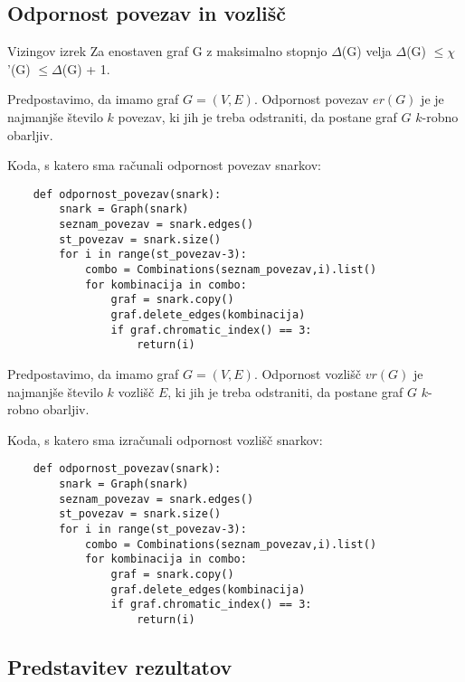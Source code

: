 \documentclass[a4paper, 10pt]{article}
\begin{document}
\subsection*{Odpornost povezav in vozlišč}

\begin{theorem}{Vizingov izrek}
    Za enostaven graf G z maksimalno stopnjo $\Delta$(G) velja
    $\Delta$(G) $\leq \chi$'(G) $\leq \Delta$(G) + 1. 
\end{theorem}

\begin{definition}
    Predpostavimo, da imamo graf $G = (V,E)$. Odpornost povezav $er(G)$ je je najmanjše 
    število $k$ povezav, ki jih je treba odstraniti, da postane graf $G$ $k$-robno obarljiv. 
\end{definition}

Koda, s katero sma računali odpornost povezav snarkov:
\begin{lstlisting}
    def odpornost_povezav(snark):
        snark = Graph(snark)
        seznam_povezav = snark.edges()
        st_povezav = snark.size()
        for i in range(st_povezav-3):
            combo = Combinations(seznam_povezav,i).list()
            for kombinacija in combo:
                graf = snark.copy()
                graf.delete_edges(kombinacija)
                if graf.chromatic_index() == 3:
                    return(i)
\end{lstlisting}
\pagebreak

\begin{definition}
    Predpostavimo, da imamo graf $G = (V,E)$. Odpornost vozlišč $vr(G)$ je najmanjše število $k$
    vozlišč $E$, ki jih je treba odstraniti, da postane graf $G$ $k$-robno obarljiv.
\end{definition}

Koda, s katero sma izračunali odpornost vozlišč snarkov: 
\begin{lstlisting}
    def odpornost_povezav(snark):
        snark = Graph(snark)
        seznam_povezav = snark.edges()
        st_povezav = snark.size()
        for i in range(st_povezav-3):
            combo = Combinations(seznam_povezav,i).list()
            for kombinacija in combo:
                graf = snark.copy()
                graf.delete_edges(kombinacija)
                if graf.chromatic_index() == 3:
                    return(i)
\end{lstlisting}

\subsection*{Predstavitev rezultatov}
\end{document}
